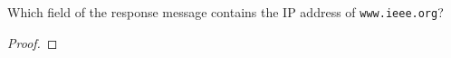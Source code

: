 \documentclass[../../main.tex]{subfiles}
\begin{document}
\begin{wts}
Which field of the response message contains the IP address of \lstinline{www.ieee.org}?
\end{wts}
\begin{proof}

\end{proof}
\end{document}
